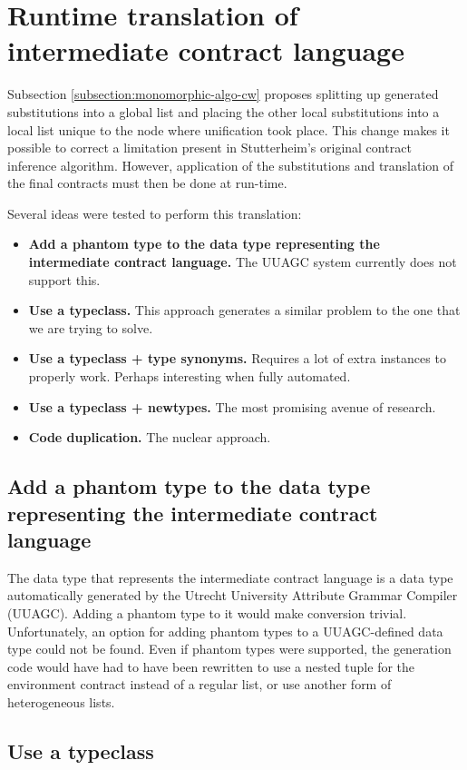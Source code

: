 \documentclass[10pt]{report}
\begin{document}
{\section{Runtime translation of intermediate contract language}
\label{futurework:runtimetranslation}

Subsection \ref{subsection:monomorphic-algo-cw} proposes splitting up generated substitutions into a global list and placing the other local substitutions into a local list unique to the node where unification took place.
This change makes it possible to correct a limitation present in Stutterheim's original contract inference algorithm.
However, application of the substitutions and translation of the final contracts must then be done at run-time.

Several ideas were tested to perform this translation:
\begin{itemize}
	\item \textbf{Add a phantom type to the data type representing the intermediate contract language.} The UUAGC system currently does not support this.
	\item \textbf{Use a typeclass.} This approach generates a similar problem to the one that we are trying to solve.
	\item \textbf{Use a typeclass + type synonyms.} Requires a lot of extra instances to properly work. Perhaps interesting when fully automated.
	\item \textbf{Use a typeclass + newtypes.} The most promising avenue of research.
	\item \textbf{Code duplication.} The nuclear approach.
\end{itemize}

\subsection{Add a phantom type to the data type representing the intermediate contract language}
The data type that represents the intermediate contract language is a data type automatically generated by the Utrecht University Attribute Grammar Compiler (UUAGC). 
Adding a phantom type to it would make conversion trivial.
Unfortunately, an option for adding phantom types to a UUAGC-defined data type could not be found.
Even if phantom types were supported, the generation code would have had to have been rewritten to use a nested tuple for the environment contract instead of a regular list, or use another form of heterogeneous lists.

\subsection{Use a typeclass}

}
\end{document}
